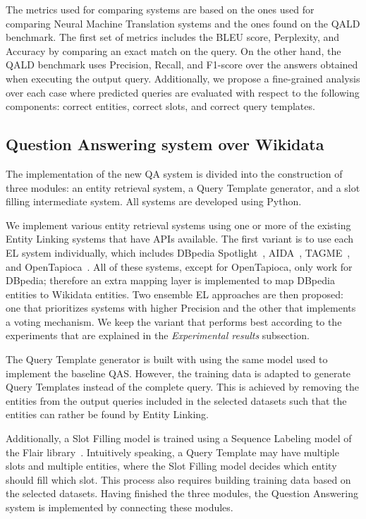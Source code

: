 The metrics used for comparing systems are based on the ones used for comparing Neural 
Machine Translation systems and the ones found on the QALD benchmark. The first set of 
metrics includes the BLEU score, Perplexity, and Accuracy by comparing an exact match on 
the \SPARQL{} query. On the other hand, the QALD benchmark uses Precision, Recall, and F1-score 
over the answers obtained when executing the output \SPARQL{} query. Additionally, 
we propose a fine-grained analysis over each case where predicted queries are evaluated with 
respect to the following components: correct entities, correct slots, and correct query 
templates.

\subsection*{Question Answering system over Wikidata}
\label{cap1:intro/contributions/qaWikidata}
The implementation of the new QA system is divided into the construction of three modules: 
an entity retrieval system, a Query Template generator, and a slot filling intermediate 
system. All systems are developed using Python.

We implement various entity retrieval systems using one or more of the existing Entity 
Linking systems that have APIs available. The first variant is to use each EL system individually, 
which includes DBpedia Spotlight~\cite{EL:dbpedia-spotlight-MendesJGB11}, AIDA~\cite{EL:aida-tool-YosefHBSW11}, 
TAGME~\cite{EL:tagme-FerraginaS10}, and OpenTapioca~\cite{EL:opentapioca-Delpeuch19}. 
All of these systems, except for OpenTapioca, only work for DBpedia; therefore an 
extra mapping layer is implemented to map DBpedia entities to Wikidata entities. Two ensemble 
EL approaches are then proposed: one that prioritizes systems with higher Precision 
and the other that implements a voting mechanism. We keep the variant that performs best 
according to the experiments that are explained in the \textit{Experimental results} subsection.

The Query Template generator is built with using the same model used to implement the baseline QAS. 
However, the training data is adapted to generate Query Templates instead of the complete 
query. This is achieved by removing the entities from the output \SPARQL{} queries included 
in the selected datasets such that the entities can rather be found by Entity Linking.

Additionally, a Slot Filling model is trained using a Sequence Labeling model of the Flair 
library~\cite{seqlab:flair-AkbikBBRSV19}. Intuitively speaking, a Query Template may have 
multiple slots and multiple entities, where the Slot Filling model decides which entity should 
fill which slot. This process also requires building training data based on the selected datasets. 
Having finished the three modules, the Question Answering system is implemented by 
connecting these modules.

